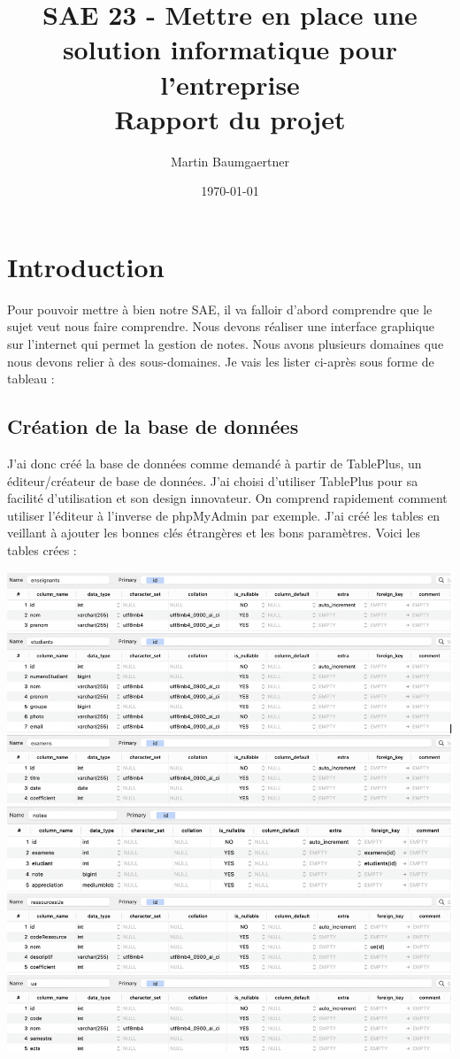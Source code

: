 \documentclass{report}
\begin{document}
    \title{\huge SAE 23 - Mettre en place une
    solution informatique pour l'entreprise \\ \Large \medskip Rapport du projet}
    \author{Martin Baumgaertner}
    \date{\today}
    \maketitle
    \maketitle
    \tableofcontents
    
    \chapter{Introduction}
    Pour pouvoir mettre à bien notre SAE, il va falloir d’abord comprendre que le sujet veut nous faire comprendre. Nous devons réaliser une interface graphique sur l’internet qui permet la gestion de notes. 
    Nous avons plusieurs domaines que nous devons relier à des sous-domaines. Je vais les lister ci-après sous forme de tableau :
        \section{Création de la base de données}
        J’ai donc créé la base de données comme demandé à partir de TablePlus, un éditeur/créateur de base de données. J’ai choisi d’utiliser TablePlus pour sa facilité d’utilisation et son design innovateur. On comprend rapidement comment utiliser l’éditeur à l’inverse de phpMyAdmin par exemple. 
        J’ai créé les tables en veillant à ajouter les bonnes clés étrangères et les bons paramètres. Voici les tables crées : 
        
        \centering\includegraphics[scale=0.3]{img1.png}
\end{document}
